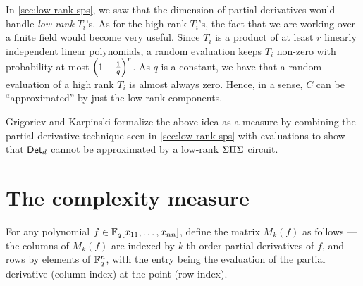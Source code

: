 In \autoref{sec:low-rank-sps}, we saw that the dimension of partial
derivatives would handle \emph{low rank} $T_i$'s. 
As for the high rank
$T_i$'s, the fact that we are working over a finite field would become
very useful. 
Since $T_i$ is a product of at least $r$ linearly
independent linear polynomials, a random evaluation keeps $T_i$
non-zero with probability at most $\left(1-\frac{1}{q}\right)^r$. 
As $q$
is a constant, we have that a random evaluation of a high rank $T_i$
is almost always zero. 
Hence, in a sense, $C$ can be ``approximated''
by just the low-rank components.

Grigoriev and Karpinski \cite{grigoriev98} formalize the above idea as
a measure by combining the partial derivative technique seen in
\autoref{sec:low-rank-sps} with evaluations to show that $\operatorname{\mathsf{Det}}_d$
cannot be approximated by a low-rank $\Sigma\Pi\Sigma$ circuit.

\section{The complexity measure}

For any polynomial $f \in \mathbb{F}_q[x_{11},\dots, x_{nn}]$, define the matrix
$M_k(f)$ as follows --- the columns of $M_k(f)$ are indexed by $k$-th
order partial derivatives of $f$, and rows by elements of $\mathbb{F}_q^{n}$,
with the entry being the evaluation of the partial derivative (column
index) at the point (row index).\\



